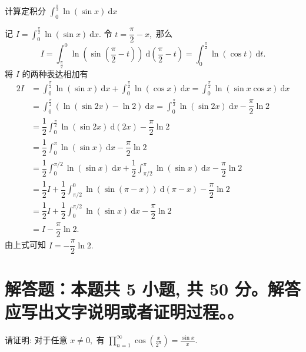 \begin{question}[points = 10]
计算定积分 $\displaystyle \int_{0}^{\frac{\pi}{2}} \ln(\sin x) ~ \mathrm{d}x$

\end{question}

\begin{solution}
记 $\displaystyle I = \int_{0}^{\frac{\pi}{2}} \ln(\sin x) ~ \mathrm{d}x.$ 令 $t = \dfrac{\pi}{2} - x,$ 那么
\[
I = \int_{\frac{\pi}{2}}^{0} \ln \left( \sin \left( \dfrac{\pi}{2} - t \right) \right) ~ \mathrm{d} \left( \dfrac{\pi}{2} - t \right) = \int_{0}^{\frac{\pi}{2}} \ln(\cos t) ~ \mathrm{d}t.
\]
将 $I$ 的两种表达相加有
\begin{align*}
2I & = \int_{0}^{\frac{\pi}{2}} \ln(\sin x) ~ \mathrm{d}x + \int_{0}^{\frac{\pi}{2}} \ln(\cos x) ~ \mathrm{d}x = \int_{0}^{\frac{\pi}{2}} \ln(\sin x \cos x) ~ \mathrm{d}x \\
& = \int_{0}^{\frac{\pi}{2}} (\ln(\sin 2x) - \ln 2) ~ \mathrm{d}x = \int_{0}^{\frac{\pi}{2}} \ln(\sin 2x) ~ \mathrm{d}x - \dfrac{\pi}{2} \ln 2 \\
& = \dfrac{1}{2}\int_{0}^{\frac{\pi}{2}} \ln(\sin 2x) ~ \mathrm{d}(2x) - \dfrac{\pi}{2} \ln 2 \\
& = \dfrac{1}{2}\int_{0}^{\pi} \ln(\sin x) ~ \mathrm{d}x - \dfrac{\pi}{2} \ln 2 \\
& = \dfrac{1}{2}\int_{0}^{\pi/2} \ln(\sin x) ~ \mathrm{d}x + \dfrac{1}{2}\int_{\pi/2}^{\pi} \ln(\sin x) ~ \mathrm{d}x - \dfrac{\pi}{2} \ln 2 \\
& = \dfrac{1}{2} I + \dfrac{1}{2}\int_{\pi/2}^{0} \ln(\sin (\pi - x)) ~ \mathrm{d}(\pi-x) - \dfrac{\pi}{2} \ln 2 \\
& = \dfrac{1}{2} I + \dfrac{1}{2}\int_{0}^{\pi/2} \ln(\sin x) ~ \mathrm{d}x - \dfrac{\pi}{2} \ln 2 \\
& = I - \dfrac{\pi}{2} \ln 2.
\end{align*}
由上式可知 $I = - \dfrac{\pi}{2} \ln 2.$
\end{solution}


\showquestionpoints
\section{解答题：本题共 5 小题, 共 50 分。解答应写出文字说明或者证明过程。。}


\begin{question}[points = 8]
请证明: 对于任意 $x \neq 0,$ 有 $\prod_{n=1}^\infty \cos \left( \frac{x}{2^n} \right) = \frac{\sin x}{x}.$

\end{question}

